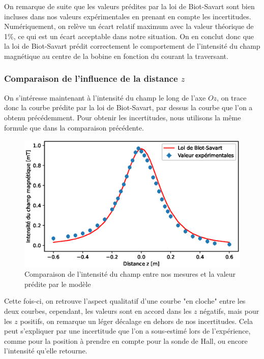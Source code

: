 \documentclass[12pt]{article}
\begin{document}
On remarque de suite que les valeurs prédites par la loi de Biot-Savart sont bien incluses dans nos valeurs expérimentales en prenant en compte les incertitudes. Numériquement, 
on relève un écart relatif maximum avec la valeur théorique de 1\%, ce qui est un écart acceptable dans notre situation. On en conclut donc que la loi de Biot-Savart 
prédit correctement le comportement de l'intensité du champ magnétique au centre de la bobine en fonction du courant la traversant.

\newpage
\subsubsection{Comparaison de l'influence de la distance $z$}
On s'intéresse maintenant à l'intensité du champ le long de l'axe $Oz$, on trace donc la courbe prédite par la loi de Biot-Savart, par dessus la courbe que l'on a obtenu précédemment.
Pour obtenir les incertitudes, nous utilisons la même formule que dans la comparaison précédente.

\begin{figure}[h!]
    \begin{center}
        \includegraphics[scale=0.6]{img/ComparaisonB.eps}
    \end{center}
    \caption{Comparaison de l'intensité du champ entre nos mesures et la valeur prédite par le modèle}
\end{figure}

Cette fois-ci, on retrouve l'aspect qualitatif d'une courbe "en cloche" entre les deux courbes, cependant,
les valeurs sont en accord dans les $z$ négatifs, mais pour les $z$ positifs, on remarque un léger décalage en dehors de nos incertitudes.
Cela peut s'expliquer par une incertitude que l'on a sous-estimé lors de l'expérience, comme pour la position à prendre en compte
pour la sonde de Hall, ou encore l'intensité qu'elle retourne.
\end{document}
